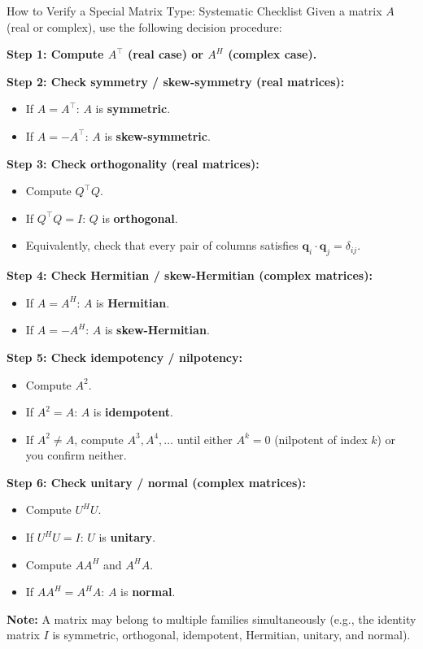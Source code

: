 \documentclass[12pt,a4paper]{article}
\begin{document}
\begin{infobox}{How to Verify a Special Matrix Type: Systematic Checklist}
Given a matrix $A$ (real or complex), use the following decision procedure:

\medskip
\textbf{Step 1: Compute $A^\top$ (real case) or $A^H$ (complex case).}

\medskip
\textbf{Step 2: Check symmetry / skew-symmetry (real matrices):}
\begin{itemize}
  \item If $A = A^\top$: $A$ is \textbf{symmetric}.
  \item If $A = -A^\top$: $A$ is \textbf{skew-symmetric}.
\end{itemize}

\textbf{Step 3: Check orthogonality (real matrices):}
\begin{itemize}
  \item Compute $Q^\top Q$.
  \item If $Q^\top Q = I$: $Q$ is \textbf{orthogonal}.
  \item Equivalently, check that every pair of columns satisfies $\mathbf{q}_i \cdot \mathbf{q}_j = \delta_{ij}$.
\end{itemize}

\textbf{Step 4: Check Hermitian / skew-Hermitian (complex matrices):}
\begin{itemize}
  \item If $A = A^H$: $A$ is \textbf{Hermitian}.
  \item If $A = -A^H$: $A$ is \textbf{skew-Hermitian}.
\end{itemize}

\textbf{Step 5: Check idempotency / nilpotency:}
\begin{itemize}
  \item Compute $A^2$.
  \item If $A^2 = A$: $A$ is \textbf{idempotent}.
  \item If $A^2 \neq A$, compute $A^3, A^4, \ldots$ until either $A^k = 0$ (nilpotent of index $k$) or you confirm neither.
\end{itemize}

\textbf{Step 6: Check unitary / normal (complex matrices):}
\begin{itemize}
  \item Compute $U^H U$.
  \item If $U^H U = I$: $U$ is \textbf{unitary}.
  \item Compute $AA^H$ and $A^H A$.
  \item If $AA^H = A^H A$: $A$ is \textbf{normal}.
\end{itemize}

\medskip
\textbf{Note:} A matrix may belong to multiple families simultaneously
(e.g., the identity matrix $I$ is symmetric, orthogonal, idempotent, Hermitian, unitary, and normal).
\end{infobox}
\end{document}
